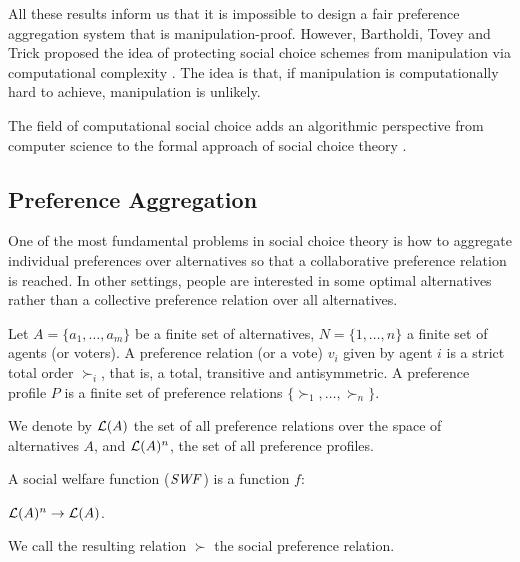 All these results inform us that it is impossible to design a fair preference
aggregation system that is manipulation-proof.
However, Bartholdi, Tovey and Trick proposed the idea of protecting
social choice schemes from manipulation via computational
complexity \cite{bartholdi:j:whowon,bartholdi:j:compdiff,
bartholdi:j:howhard}.
The idea is that, if manipulation is computationally hard to
achieve, manipulation is unlikely.

The field of computational social choice adds an algorithmic
perspective from computer science
to the formal approach of social choice theory
\cite{Brandt:COMSOC}.




\subsection{Preference Aggregation}
One of the most fundamental problems in social choice theory is how to
aggregate individual preferences over alternatives so that a
collaborative preference relation is reached.
In other settings, people are interested in some optimal alternatives
rather than a collective preference relation over all alternatives.

\begin{definition}
	Let $A=\{a_1,\ldots,a_m\}$ be a finite set of alternatives,
	$N=\{1,\ldots,n\}$ a finite set of agents (or voters).
	A preference relation (or a vote) $v_i$ given by agent $i$ 
	is a strict total order $\succ_i$,
	that is, a total, transitive and antisymmetric.
	A preference profile $P$ is a finite set of preference relations
	$\{\succ_1, \ldots, \succ_n\}$.
\end{definition}

We denote by $\mathcal{L}(A)$ the set of all preference relations over
the space of alternatives $A$, and $\mathcal{L}(A)^n$, the set of all
preference profiles.

\begin{definition}
	A social welfare function ($\it{SWF}$) is a function $f$:
	\begin{center}
		$\mathcal{L}(A)^n \rightarrow \mathcal{L}(A)$.
	\end{center}
	We call the resulting relation $\succ$ the social preference relation.
\end{definition}

